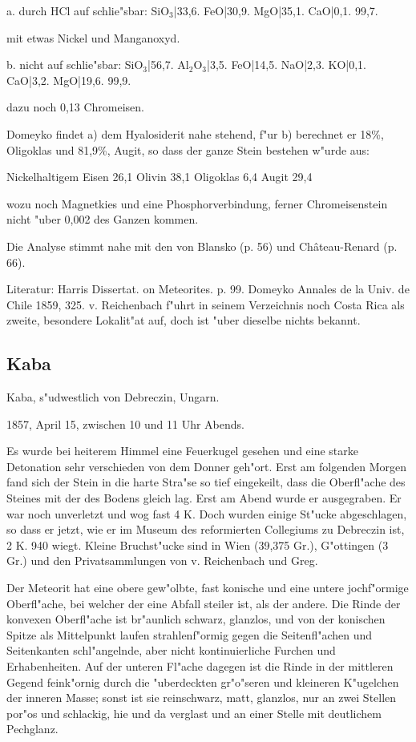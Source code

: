 \documentclass[a4paper, 11pt, oneside]{article}
\begin{document}
a. durch HCl auf schlie"sbar:  
SiO$_{3}$|33,6.  
FeO|30,9.  
MgO|35,1.  
CaO|0,1.  
99,7.

mit etwas Nickel und Manganoxyd.

b. nicht auf schlie"sbar:  
SiO$_{3}$|56,7.  
Al$_{2}$O$_{3}$|3,5.  
FeO|14,5.  
NaO|2,3.  
KO|0,1.  
CaO|3,2.  
MgO|19,6.  
99,9.

dazu noch 0,13 Chromeisen.

Domeyko findet a) dem Hyalosiderit nahe stehend, f"ur b) berechnet er 18\%, Oligoklas und 81,9\%, Augit, so dass der ganze Stein bestehen w"urde aus:

Nickelhaltigem Eisen 26,1  
Olivin 38,1  
Oligoklas 6,4  
Augit 29,4

wozu noch Magnetkies und eine Phosphorverbindung, ferner Chromeisenstein nicht "uber 0,002 des Ganzen kommen.

Die Analyse stimmt nahe mit den von Blansko (p. 56) und Château-Renard (p. 66).

Literatur: Harris Dissertat. on Meteorites. p. 99. Domeyko Annales de la Univ. de Chile 1859, 325. v. Reichenbach f"uhrt in seinem Verzeichnis noch Costa Rica als zweite, besondere Lokalit"at auf, doch ist "uber dieselbe nichts bekannt.

\subsection{Kaba}

Kaba, s"udwestlich von Debreczin, Ungarn.

1857, April 15, zwischen 10 und 11 Uhr Abends.

Es wurde bei heiterem Himmel eine Feuerkugel gesehen und eine starke Detonation sehr verschieden von dem Donner geh"ort. Erst am folgenden Morgen fand sich der Stein in die harte Stra"se so tief eingekeilt, dass die Oberfl"ache des Steines mit der des Bodens gleich lag. Erst am Abend wurde er ausgegraben. Er war noch unverletzt und wog fast 4 K. Doch wurden einige St"ucke abgeschlagen, so dass er jetzt, wie er im Museum des reformierten Collegiums zu Debreczin ist, 2 K. 940 wiegt. Kleine Bruchst"ucke sind in Wien (39,375 Gr.), G"ottingen (3 Gr.) und den Privatsammlungen von v. Reichenbach und Greg.

Der Meteorit hat eine obere gew"olbte, fast konische und eine untere jochf"ormige Oberfl"ache, bei welcher der eine Abfall steiler ist, als der andere. Die Rinde der konvexen Oberfl"ache ist br"aunlich schwarz, glanzlos, und von der konischen Spitze als Mittelpunkt laufen strahlenf"ormig gegen die Seitenfl"achen und Seitenkanten schl"angelnde, aber nicht kontinuierliche Furchen und Erhabenheiten. Auf der unteren Fl"ache dagegen ist die Rinde in der mittleren Gegend feink"ornig durch die "uberdeckten gr"o"seren und kleineren K"ugelchen der inneren Masse; sonst ist sie reinschwarz, matt, glanzlos, nur an zwei Stellen por"os und schlackig, hie und da verglast und an einer Stelle mit deutlichem Pechglanz.
\end{document}
